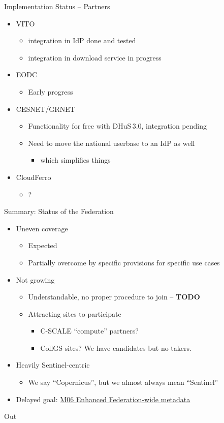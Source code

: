 \documentclass[c,aspectratio=169,14pt]{beamer}
\begin{document}
\begin{frame}{Implementation Status -- Partners}

\begin{itemize}
\item VITO
\begin{itemize}
\item integration in IdP done and tested
\item integration in download service in progress
\end{itemize}
\item EODC
\begin{itemize}
\item Early progress
\end{itemize}
\item CESNET/GRNET
\begin{itemize}
\item Functionality for free with DHuS\,3.0, integration pending
\item Need to move the national userbase to an IdP as well
\begin{itemize}
\item which simplifies things
\end{itemize}
\end{itemize}
\item CloudFerro
\begin{itemize}
\item ?
\end{itemize}
\end{itemize}
\end{frame}

\begin{frame}{Summary: Status of the Federation}
\begin{itemize}
\item Uneven coverage
\begin{itemize}
\item Expected
\item Partially overcome by specific provisions for specific use cases
\end{itemize}
\item Not growing
\begin{itemize}
\item Understandable, no proper procedure to join -- \textbf{TODO}
\item Attracting sites to participate
\begin{itemize}
\item C-SCALE ``compute'' partners?
\item CollGS sites? We have candidates but no takers.
\end{itemize}
\end{itemize}
\item Heavily Sentinel-centric
\begin{itemize}
\item We say ``Copernicus'', but we almost always mean ``Sentinel''
\end{itemize}
\item Delayed goal: \href{https://confluence.egi.eu/x/lhBmBQ}{M06 Enhanced Federation-wide metadata}
\end{itemize}
\end{frame}


\begin{finalframe}
\hfill Out\hfill\null
\end{finalframe}
\end{document}
